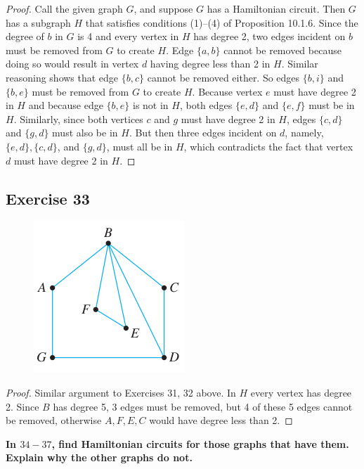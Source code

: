 \documentclass[14pt]{extarticle}
\newcommand{\cy}{\color{cyan}}
\begin{document}
\begin{proof}
Call the given graph \(G\), and suppose \(G\) has a Hamiltonian circuit. Then \(G\) has a subgraph \(H\) that 
satisfies conditions (1)–(4) of Proposition 10.1.6. Since the degree of \(b\) in \(G\) is 4 and every vertex in \(H\) has 
degree 2, two edges incident on \(b\) must be removed from \(G\) to create \(H\). Edge \(\{a, b\}\) cannot be removed 
because doing so would result in vertex \(d\) having degree less than 2 in \(H\). Similar reasoning shows that edge 
\(\{b, c\}\) cannot be removed either. So edges \(\{b, i\}\) and \(\{b, e\}\) must be removed from \(G\) to create \(H\). 
Because vertex \(e\) must have degree 2 in \(H\) and because edge \(\{b, e\}\) is not in \(H\), both edges \(\{e, d\}\) and 
\(\{e, f\}\) must be in \(H\). Similarly, since both vertices \(c\) and \(g\) must have degree 2 in \(H\), edges \(\{c,d\}\) 
and \(\{g, d\}\) must also be in \(H\). But then three edges incident on \(d\), namely, \(\{e, d\}, \{c, d\}\), and 
\(\{g, d\}\), must all be in \(H\), which contradicts the fact that vertex \(d\) must have degree 2 in \(H\).
\end{proof}

\subsection{Exercise 33}
\begin{figure}[ht!]
\centering
\includegraphics[scale=0.6]{../images/10.1.33.png}
\end{figure}

\begin{proof}
Similar argument to Exercises 31, 32 above. In \(H\) every vertex has degree 2. Since \(B\) has degree 5, 3 edges must be 
removed, but 4 of these 5 edges cannot be removed, otherwise \(A,F,E,C\) would have degree less than 2.
\end{proof}

{\bf \cy In $34-37$, find Hamiltonian circuits for those graphs that have them. Explain why the other graphs do not.}
\end{document}
